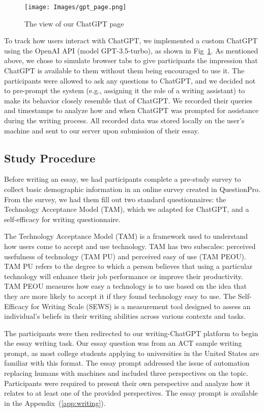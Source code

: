 \documentclass[manuscript,screen,acmsmall]{acmart}
\begin{document}
\begin{figure}[h!]
    \centering
    \texttt{[image: Images/gpt\_page.png]}
    \caption{The view of our ChatGPT page}
    \label{fig:gpt_page}
\end{figure}

To track how users interact with ChatGPT, we implemented a custom ChatGPT using the OpenAI API (model GPT-3.5-turbo), as shown in Fig~\ref{fig:gpt_page}. As mentioned above, we chose to simulate browser tabs to give participants the impression that ChatGPT is available to them without them being encouraged to use it. The participants were allowed to ask any questions to ChatGPT, and we decided not to pre-prompt the system (e.g., assigning it the role of a writing assistant) to make its behavior closely resemble that of ChatGPT. We recorded their queries and timestamps to analyze how and when ChatGPT was prompted for assistance during the writing process. All recorded data was stored locally on the user's machine and sent to our server upon submission of their essay.


\subsection{Study Procedure}
Before writing an essay, we had participants complete a pre-study survey to collect basic demographic information in an online survey created in QuestionPro.
From the survey, we had them fill out two standard questionnaires: the Technology Acceptance Model (TAM)\cite{davis_perceived_1989}, which we adapted for ChatGPT, and a self-efficacy for writing questionnaire.

The Technology Acceptance Model (TAM) is a framework used to understand how users come to accept and use technology. TAM has two subscales: perceived usefulness of technology (TAM PU) and perceived easy of use (TAM PEOU). TAM PU refers to the degree to which a person believes that using a particular technology will enhance their job performance or improve their productivity. TAM PEOU measures how easy a technology is to use based on the idea that they are more likely to accept it if they found technology easy to use.  
The Self-Efficacy for Writing Scale (SEWS) is a measurement tool designed to assess an individual's beliefs in their writing abilities across various contexts and tasks.

The participants were then redirected to our writing-ChatGPT platform to begin the essay writing task. Our essay question was from an ACT sample writing prompt, as most college students applying to universities in the United States are familiar with this format. The essay prompt addressed the issue of automation replacing humans with machines and included three perspectives on the topic. Participants were required to present their own perspective and analyze how it relates to at least one of the provided perspectives. The essay prompt is available in the Appendix~(\ref{app:writing}).
\end{document}
